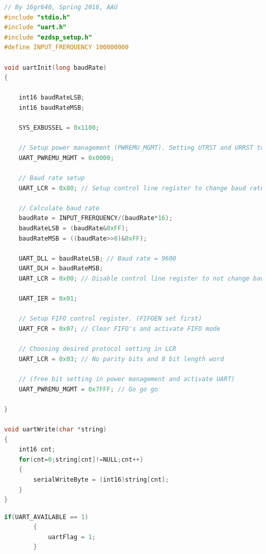 \begin{lstlisting}[language=C, caption = {Initialization of UART},label={listingUartInit}]
// By 16gr640, Spring 2016, AAU
#include "stdio.h"
#include "uart.h"
#include "ezdsp_setup.h"
#define INPUT_FRERQUENCY 100000000

void uartInit(long baudRate)
{
	
	int16 baudRateLSB;
	int16 baudRateMSB;
	
	SYS_EXBUSSEL = 0x1100;
	
	// Setup power management (PWREMU_MGMT). Setting UTRST and URRST to 0
	UART_PWREMU_MGMT = 0x0000;
	
	// Baud rate setup 
	UART_LCR = 0x80; // Setup control line register to change baud rate
	
	// Calculate baud rate
	baudRate = INPUT_FRERQUENCY/(baudRate*16);
	baudRateLSB = (baudRate&0xFF);
	baudRateMSB = ((baudRate>>8)&0xFF);
	
	UART_DLL = baudRateLSB; // Baud rate = 9600
	UART_DLH = baudRateMSB;
	UART_LCR = 0x00; // Disable control line register to not change baud rate
	
	UART_IER = 0x01;
	
	// Setup FIFO control register. (FIFOEN set first) 
	UART_FCR = 0x07; // Clear FIFO's and activate FIFO mode
	
	// Choosing desired protocol setting in LCR
	UART_LCR = 0x03; // No parity bits and 8 bit length word
	
	// (free bit setting in power management and activate UART)
	UART_PWREMU_MGMT = 0x7FFF; // Go go go
	
}

void uartWrite(char *string)
{
	int16 cnt;
	for(cnt=0;string[cnt]!=NULL;cnt++)
	{
		serialWriteByte = (int16)string[cnt];
	}
}
\end{lstlisting}

\begin{lstlisting}[language=C, caption = {Set a flag high if data available in FIFO},label={listingUartFlag}]
    	if(UART_AVAILABLE == 1)
    	{	
			uartFlag = 1;
		}
\end{lstlisting}


